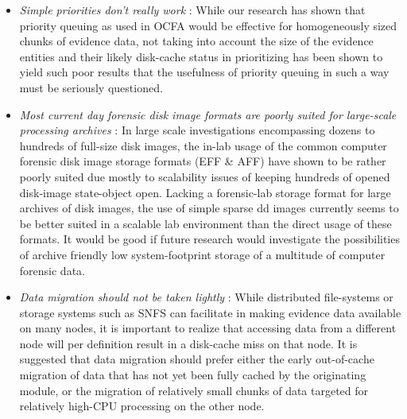 \begin{itemize}
\item \emph{Simple priorities don't really work} : While our research has shown that priority queuing as used in OCFA would be effective for homogeneously sized chunks of evidence data, not taking into account the size of the evidence entities and their likely disk-cache status in prioritizing has been shown to yield such poor results that the usefulness of priority queuing in such a way must be seriously questioned. 
\item \emph{Most current day forensic disk image formats are poorly suited for large-scale processing archives} : In large scale investigations encompassing dozens to hundreds of full-size disk images, the in-lab usage of the common computer forensic disk image storage formats (EFF \& AFF) have shown to be rather poorly suited due mostly to scalability issues of keeping hundreds of opened disk-image state-object open. Lacking a forensic-lab storage format for large archives of disk images, the use of simple sparse dd images currently seems to be better suited in a scalable lab environment than the direct usage of these formats. It would be good if future research would investigate the possibilities of archive friendly low system-footprint storage of a multitude of computer forensic data. 
\item \emph{Data migration should not be taken lightly} : While distributed file-systems or storage systems such as SNFS can facilitate in making evidence data available on many nodes, it is important to realize that accessing data from a different node will per definition result in a disk-cache miss on that node. It is suggested that data migration should prefer either the early out-of-cache migration of data that has not yet been fully cached by the originating module, or the migration of relatively small chunks of data targeted for relatively high-CPU processing on the other node. 

\end{itemize}

